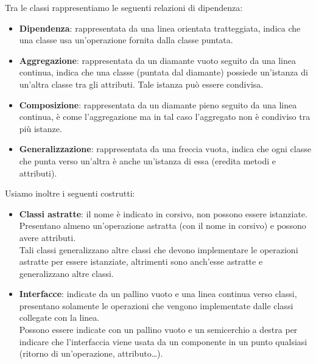         Tra le classi rappresentiamo le seguenti relazioni di dipendenza:
        \begin{itemize}
            \item \textbf{Dipendenza}: rappresentata da una linea orientata tratteggiata, indica che una classe usa un'operazione fornita dalla classe puntata.
            \item \textbf{Aggregazione}: rappresentata da un diamante vuoto seguito da una linea continua, indica che una classe (puntata dal diamante) possiede un'istanza di un'altra classe tra gli attributi. Tale istanza può essere condivisa.
            \item \textbf{Composizione}: rappresentata da un diamante pieno seguito da una linea continua, è come l'aggregazione ma in tal caso l'aggregato non è condiviso tra più istanze.
            \item \textbf{Generalizzazione}: rappresentata da una freccia vuota, indica che ogni classe che punta verso un'altra è anche un'istanza di essa (eredita metodi e attributi).
        \end{itemize}
        Usiamo inoltre i seguenti costrutti:
            \begin{itemize}
                \item \textbf{Classi astratte}: il nome è indicato in corsivo, non possono essere istanziate. Presentano almeno un'operazione astratta (con il nome in corsivo) e possono avere attributi.\\
                Tali classi generalizzano altre classi che devono implementare le operazioni astratte per essere istanziate, altrimenti sono anch'esse astratte e generalizzano altre classi.
                \item \textbf{Interfacce}: indicate da un pallino vuoto e una linea continua verso classi, presentano solamente le operazioni che vengono implementate dalle classi collegate con la linea.\\
                Possono essere indicate con un pallino vuoto e un semicerchio a destra per indicare che l'interfaccia viene usata da un componente in un punto qualsiasi (ritorno di un'operazione, attributo\dots).
            \end{itemize}

